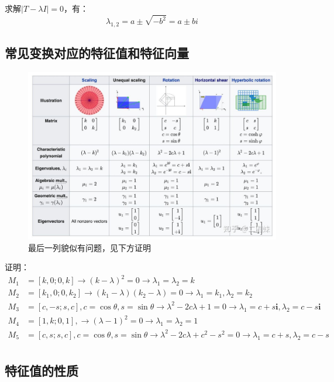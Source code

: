 \documentclass[12pt]{article}
\begin{document}
求解$|T-\lambda I| = 0$，有：
$$
\lambda_{1,2} = a \pm \sqrt{-b^2} = a \pm bi
$$

\subsection{常见变换对应的特征值和特征向量}
\begin{figure}[H]
    \centering
    \includegraphics[width=1.0\textwidth]{fig/EigenValueVectorsCommon.jpg}
    \caption*{最后一列貌似有问题，见下方证明}
\end{figure} 
\begin{framed}  
\small{
证明：
\begin{align*}
M_1 &= [k,0;0,k] \rightarrow (k-\lambda)^2 = 0 \rightarrow \lambda_1 = \lambda_2 = k \\
M_2 &= [k_1,0;0,k_2] \rightarrow (k_1 - \lambda)(k_2 - \lambda) = 0 \rightarrow \lambda_1 = k_1, \lambda_2 = k_2 \\
M_3 &= [c, -s; s, c], c = \cos\theta, s = \sin\theta \rightarrow  \lambda^2 - 2c\lambda + 1 = 0\rightarrow \lambda_1 = c + s\mathbf{i}, \lambda_2 = c - s\mathbf{i} \\
M_4 &= [1,k;0,1],  \rightarrow  (\lambda-1)^2 = 0 \rightarrow \lambda_1 = \lambda_2 = 1 \\
M_5 &= [c, s; s, c], c = \cos\theta, s = \sin\theta \rightarrow  \lambda^2 - 2c\lambda + c^2 - s^2 = 0\rightarrow \lambda_1 = c + s, \lambda_2 = c - s \\
\end{align*}
}
\end{framed}

\subsection{特征值的性质\cite{Eigen_Value_And_Eigen_Vector_Zhihu}}
\end{document}
